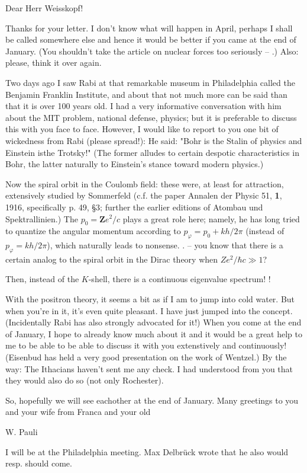 \date{December 6, 1940}

Dear Herr Weisskopf!

Thanks for your letter. I don't know what will happen in April, perhaps I shall be called somewhere else and hence it would be better if you came at the end of January. (You shouldn't take the article on nuclear forces too seriously -- .) Also: please, think it over again.

Two days ago I saw Rabi at that remarkable museum in Philadelphia called the Benjamin Franklin Institute, and about that not much more can be said than that it is over 100 years old. I had a very informative conversation with him about the MIT problem, national defense, physics; but it is preferable to discuss this with you face to face. However, I would like to report to you one bit of wickedness from Rabi (please spread!): He said: "Bohr is the Stalin of physics and Einstein isthe Trotsky!" (The former alludes to certain despotic characteristics in Bohr, the latter naturally to Einstein's stance toward modern physics.)

Now the spiral orbit in the Coulomb field: these were, at least for attraction, extensively studied by Sommerfeld (c.f. the paper Annalen der Physic 51, \textbf{1}, 1916, specifically p. 49, §3; further the earlier editions of Atombau und Spektrallinien.) The  $p_0 = \mathbf{Z}e^2/c$ plays a great role here; namely, he has long tried to quantize the angular momentum according to $p_\varphi = p_0 + kh/2\pi$ (instead of $p_\varphi = kh/2\pi$), which naturally leads to nonsense. . --  you know that there is a certain analog to the spiral orbit in the Dirac theory when $Ze^2/\hbar c \gg 1$?

Then, instead of the $K$-shell, there is a continuous eigenvalue spectrum! !

With the positron theory, it seems a bit as if I am to jump into cold water. But when you're in it, it's even quite pleasant. I have just jumped into the concept. (Incidentally Rabi has also strongly advocated for it!) When you come at the end of January, I hope to already know much about it and it would be a great help to me to be able to be able to discuss it with you extenstively and continuously! (Eisenbud has held a very good presentation on the work of Wentzel.) By the way: The Ithacians haven't sent me any check. I had understood from you that they would also do so (not only Rochester).

So, hopefully we will see eachother at the end of January. Many greetings to you and your wife from Franca and your old

W. Pauli

I will be at the Philadelphia meeting. Max Delbr\"uck wrote that he also would resp. should come.

